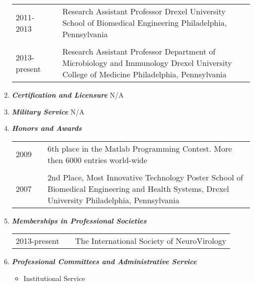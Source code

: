 \documentclass[a4paper,11pt]{article}
\begin{document}
\begin{enumerate}
\begin{longtable}{p{}p{}p{}}
  \\
  2011-2013 & & Research Assistant Professor \newline Drexel University \newline School of Biomedical Engineering \newline Philadelphia, Pennsylvania\\
  \\
  2013-present & & Research Assistant Professor \newline Department of Microbiology and Immunology \newline Drexel University College of Medicine \newline Philadelphia, Pennsylvania\\
 \end{longtable}
\pagestyle{otherpages}
 \item {\LARGE \itshape \bfseries Certification and Licensure} \newline
 N/A
 \item {\LARGE \itshape \bfseries Military Service} \newline
 N/A
 \item {\LARGE \itshape \bfseries Honors and Awards}
 \begin{longtable}{p{}p{}p{}}
  2009 & & 6th place in the Matlab Programming Contest. \newline More then 6000 entries world-wide\\
  \\
  2007 & & 2nd Place, Most Innovative Technology Poster \newline School of Biomedical Engineering and Health Systems, Drexel University \newline Philadelphia, Pennsylvania\\
  \end{longtable}
 \item {\LARGE \itshape \bfseries Memberships in Professional Societies}
  \begin{longtable}{p{}p{}p{}}
  2013-present & & The International Society of NeuroVirology\\
  \end{longtable}
 \item {\LARGE \itshape \bfseries Professional Committees and Administrative Service}
 \begin{itemize}
  \item[] Institutional Service
  \begin{longtable}{p{}p{}p{}}

\end{longtable}
\end{itemize}
\end{enumerate}
\end{document}
